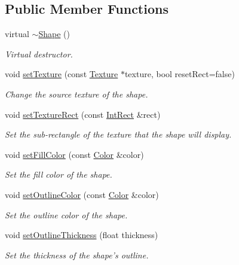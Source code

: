 \subsection*{Public Member Functions}
\begin{DoxyCompactItemize}
\item 
\hypertarget{classsf_1_1Shape_a2262aceb9df52d4275c19633592f19bf}{virtual \hyperlink{classsf_1_1Shape_a2262aceb9df52d4275c19633592f19bf}{$\sim$\-Shape} ()}\label{classsf_1_1Shape_a2262aceb9df52d4275c19633592f19bf}

\begin{DoxyCompactList}\small\item\em Virtual destructor. \end{DoxyCompactList}\item 
void \hyperlink{classsf_1_1Shape_af8fb22bab1956325be5d62282711e3b6}{set\-Texture} (const \hyperlink{classsf_1_1Texture}{Texture} $\ast$texture, bool reset\-Rect=false)
\begin{DoxyCompactList}\small\item\em Change the source texture of the shape. \end{DoxyCompactList}\item 
void \hyperlink{classsf_1_1Shape_a2029cc820d1740d14ac794b82525e157}{set\-Texture\-Rect} (const \hyperlink{classsf_1_1Rect}{Int\-Rect} \&rect)
\begin{DoxyCompactList}\small\item\em Set the sub-\/rectangle of the texture that the shape will display. \end{DoxyCompactList}\item 
void \hyperlink{classsf_1_1Shape_a3506f9b5d916fec14d583d16f23c2485}{set\-Fill\-Color} (const \hyperlink{classsf_1_1Color}{Color} \&color)
\begin{DoxyCompactList}\small\item\em Set the fill color of the shape. \end{DoxyCompactList}\item 
void \hyperlink{classsf_1_1Shape_a5978f41ee349ac3c52942996dcb184f7}{set\-Outline\-Color} (const \hyperlink{classsf_1_1Color}{Color} \&color)
\begin{DoxyCompactList}\small\item\em Set the outline color of the shape. \end{DoxyCompactList}\item 
void \hyperlink{classsf_1_1Shape_a5ad336ad74fc1f567fce3b7e44cf87dc}{set\-Outline\-Thickness} (float thickness)
\begin{DoxyCompactList}\small\item\em Set the thickness of the shape's outline. \end{DoxyCompactList}\item 

\end{DoxyCompactItemize}
